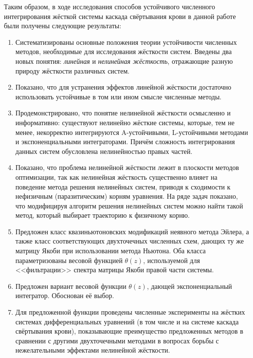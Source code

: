 Таким образом, в ходе исследования способов устойчивого численного интегрирования жёсткой системы каскада свёртывания крови
в данной работе были получены следующие результаты:
\begin{enumerate}
    \item
        Систематизированы основные положения теории устойчивости численных методов,
        необходимые для исследования жёсткости систем.
        Введены два новых понятия: \emph{линейная} и \emph{нелинейная жёсткость},
        отражающие разную природу жёсткости различных систем.
    \item
        Показано, что для устранения эффектов линейной жёсткости достаточно использовать
        устойчивые в том или ином смысле численные методы.
    \item
        Продемонстрировано, что понятие нелинейной жёсткости осмысленно и информативно:
        существуют нелинейно жёсткие системы, которые, тем не менее,
        некорректно интегрируются A-устойчивыми, L-устойчивыми методами и экспоненциальными интеграторами.
        Причём сложность интегрирования данных систем обусловлена нелинейностью правых частей.
    \item
        Показано, что проблема нелинейной жёсткости лежит в плоскости методов оптимизации,
        так как нелинейная жёсткость
        существенно влияет на поведение метода решения нелинейных систем,
        приводя к сходимости к нефизичным (паразитическим) корням уравнения.
        На ряде задач показано,
        что модифицируя алгоритм решения нелинейных систем можно найти такой метод,
        который выбирает траекторию к физичному корню.
    \item
        Предложен класс квазиньютоновских модификаций неявного метода Эйлера,
        а также класс соответствующих двухточечных численных схем,
        дающих ту же матрицу Якоби при использовании метода Ньютона.
        Оба класса параметризованы весовой функцией $ \theta(z) $,
        используемой для <<фильтрации>> спектра матрицы Якоби правой части системы.
    \item
        Предложен вариант весовой функции $ \theta(z) $,
        дающей экспоненциальный интегратор.
        Обоснован её выбор.
    \item
        Для предложенной функции проведены численные эксперименты на жёстких системах
        дифференциальных уравнений (в том числе и на системе каскада свёртывания крови),
        показывающие преимущество предложенных методов в сравнении с другими двухточечными методами
        в вопросах борьбы с нежелательными эффектами нелинейной жёсткости.
\end{enumerate}
